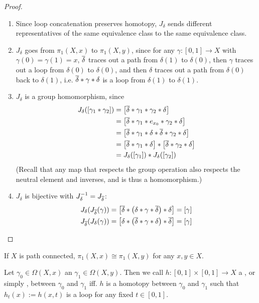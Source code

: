 \begin{proof}
	\begin{enumerate}
		\item Since loop concatenation preserves homotopy, $J_\delta$ sends different representatives of the same equivalence class to the same equivalence class.
		\item $J_\delta$ goes from $\pi_1(X,x)$ to $\pi_1(X,y)$, since for any $\gamma : [0,1] \to X$ with $\gamma(0) = \gamma(1) = x$, $\overline{{\delta}}$ traces out a path from $\delta(1)$ to $\delta(0)$, then $\gamma$ traces out a loop from $\delta(0)$ to $\delta(0)$, and then $\delta$ traces out a path from $\delta(0)$ back to $\delta(1)$, i.e. $\overline{{\delta}} * \gamma * \delta$ is a loop from $\delta(1)$ to $\delta(1)$.
		\item $J_\delta$ is a group homomorphism, since
		\begin{align*}
			J_\delta([\gamma_1 * \gamma_2])
			&=
			\qty[\overline{{\delta}} * \gamma_1 * \gamma_2 * \delta]\\
			&=
			\qty[\overline{{\delta}} * \gamma_1 * e_{x_0} * \gamma_2 * \delta]\\
			&=
			\qty[\overline{{\delta}} * \gamma_1 * \delta * \overline{{\delta}} * \gamma_2 * \delta]\\
			&=
			\qty[\overline{{\delta}} * \gamma_1 * \delta] * \qty[\overline{{\delta}} * \gamma_2 * \delta]\\
			&=
			J_\delta([\gamma_1]) * J_\delta([\gamma_2])
		\end{align*}
		(Recall that any map that respects the group operation also respects the neutral element and inverses, and is thus a homomorphism.)
		\item $J_\delta$ is bijective with $J_\delta ^{-1} = J_{\overline{{\delta}}}$:
		\begin{align*}
			J_\delta(J_{\overline{{\delta}}}(\gamma))
			&=
			\qty[\overline{{\delta}} * \qty(\delta * \gamma * \overline{{\delta}}) * \delta]
			=
			\qty[\gamma]\\
			J_{\overline{{\delta}}}(J_{\delta}(\gamma))
			&=
			\qty[\delta * \qty(\overline{{\delta}} * \gamma * \delta) * \overline{{\delta}}]
			=
			\qty[\gamma]
		\end{align*}
	\end{enumerate}
\end{proof}
\begin{corollary}
	If $X$ is path connected, $\pi_1(X,x) \cong \pi_1(X,y)$ for any $x,y \in X$.
\end{corollary}
\begin{definition}
	Let $\gamma_0 \in \Omega(X,x)$ an $\gamma_1 \in \Omega(X,y)$. Then we call $h : [0,1] \times [0,1] \to X$ a , or simply , between $\gamma_0$ and $\gamma_1$ iff. $h$ is a homotopy between $\gamma_0$ and $\gamma_1$ such that $h_t(x) := h(x,t)$ is a loop for any fixed $t \in [0,1]$.
\end{definition}
